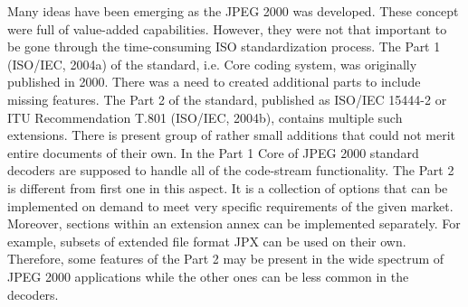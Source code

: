 Many ideas have been emerging as the JPEG 2000 was developed. These concept were full of
value-added capabilities. However, they were not that important to be gone through the time-consuming
ISO standardization process. The Part 1 (ISO/IEC, 2004a) of the standard, i.e. Core coding system, 
was originally published in 2000. There was a need to created additional parts to include
missing features. The Part 2 of the standard, published as ISO/IEC 15444-2 or ITU Recommendation
T.801 (ISO/IEC, 2004b), contains multiple such extensions. There is present group of rather small
additions that could not merit entire documents of their own. In the Part 1 Core of JPEG 2000
standard decoders are supposed to handle all of the code-stream functionality. The Part 2
is different from first one in this aspect. It is a collection of options that can be
implemented on demand to meet very specific requirements of the given market. Moreover,
sections within an extension annex can be implemented separately. For example, subsets
of extended file format JPX can be used on their own. Therefore, some features of the Part 2
may be present in the wide spectrum of JPEG 2000 applications while the other ones can be
less common in the decoders. \cite{jpeg_suite}

